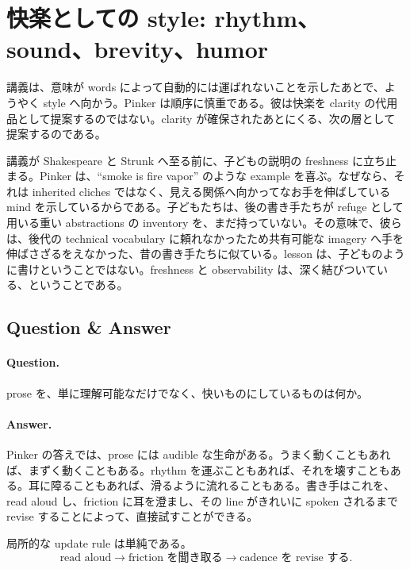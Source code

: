 \section{快楽としての style: rhythm、sound、brevity、humor}

講義は、意味が words によって自動的には運ばれないことを示したあとで、ようやく style へ向かう。Pinker は順序に慎重である。彼は快楽を clarity の代用品として提案するのではない。clarity が確保されたあとにくる、次の層として提案するのである。

講義が Shakespeare と Strunk へ至る前に、子どもの説明の freshness に立ち止まる。Pinker は、``smoke is fire vapor'' のような example を喜ぶ。なぜなら、それは inherited cliches ではなく、見える関係へ向かってなお手を伸ばしている mind を示しているからである。子どもたちは、後の書き手たちが refuge として用いる重い abstractions の inventory を、まだ持っていない。その意味で、彼らは、後代の technical vocabulary に頼れなかったため共有可能な imagery へ手を伸ばさざるをえなかった、昔の書き手たちに似ている。lesson は、子どものように書けということではない。freshness と observability は、深く結びついている、ということである。

\subsection{Question \& Answer}

\paragraph{Question.} prose を、単に理解可能なだけでなく、快いものにしているものは何か。

\paragraph{Answer.} Pinker の答えでは、prose には audible な生命がある。うまく動くこともあれば、まずく動くこともある。rhythm を運ぶこともあれば、それを壊すこともある。耳に障ることもあれば、滑るように流れることもある。書き手はこれを、read aloud し、friction に耳を澄まし、その line がきれいに spoken されるまで revise することによって、直接試すことができる。

局所的な update rule は単純である。
\begin{equation}
\text{read aloud} \to \text{friction を聞き取る} \to \text{cadence を revise する}.
\end{equation}

